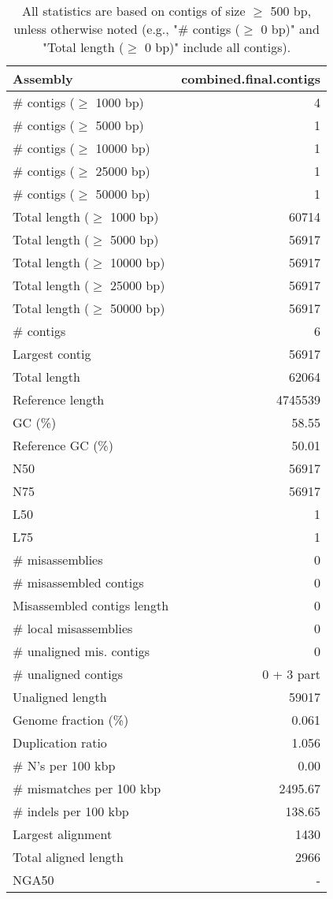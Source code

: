\documentclass[12pt,a4paper]{article}
\begin{document}
\begin{table}[ht]
\begin{center}
\caption{All statistics are based on contigs of size $\geq$ 500 bp, unless otherwise noted (e.g., "\# contigs ($\geq$ 0 bp)" and "Total length ($\geq$ 0 bp)" include all contigs).}
\begin{tabular}{|l*{1}{|r}|}
\hline
Assembly & combined.final.contigs \\ \hline
\# contigs ($\geq$ 1000 bp) & 4 \\ \hline
\# contigs ($\geq$ 5000 bp) & 1 \\ \hline
\# contigs ($\geq$ 10000 bp) & 1 \\ \hline
\# contigs ($\geq$ 25000 bp) & 1 \\ \hline
\# contigs ($\geq$ 50000 bp) & 1 \\ \hline
Total length ($\geq$ 1000 bp) & 60714 \\ \hline
Total length ($\geq$ 5000 bp) & 56917 \\ \hline
Total length ($\geq$ 10000 bp) & 56917 \\ \hline
Total length ($\geq$ 25000 bp) & 56917 \\ \hline
Total length ($\geq$ 50000 bp) & 56917 \\ \hline
\# contigs & 6 \\ \hline
Largest contig & 56917 \\ \hline
Total length & 62064 \\ \hline
Reference length & 4745539 \\ \hline
GC (\%) & 58.55 \\ \hline
Reference GC (\%) & 50.01 \\ \hline
N50 & 56917 \\ \hline
N75 & 56917 \\ \hline
L50 & 1 \\ \hline
L75 & 1 \\ \hline
\# misassemblies & 0 \\ \hline
\# misassembled contigs & 0 \\ \hline
Misassembled contigs length & 0 \\ \hline
\# local misassemblies & 0 \\ \hline
\# unaligned mis. contigs & 0 \\ \hline
\# unaligned contigs & 0 + 3 part \\ \hline
Unaligned length & 59017 \\ \hline
Genome fraction (\%) & 0.061 \\ \hline
Duplication ratio & 1.056 \\ \hline
\# N's per 100 kbp & 0.00 \\ \hline
\# mismatches per 100 kbp & 2495.67 \\ \hline
\# indels per 100 kbp & 138.65 \\ \hline
Largest alignment & 1430 \\ \hline
Total aligned length & 2966 \\ \hline
NGA50 & - \\ \hline
\end{tabular}
\end{center}
\end{table}
\end{document}
